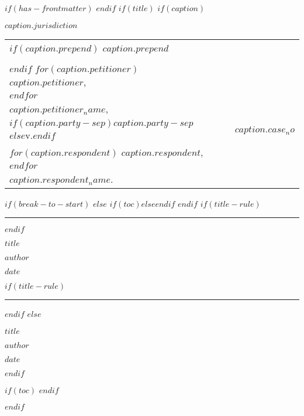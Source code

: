 $if(has-frontmatter)$
\frontmatter
$endif$
$if(title)$
\thispagestyle{empty}
$if(caption)$
\begin{center}\bfseries
    $caption.jurisdiction$
\end{center}

\vspace{1em}

\setlength{\tabcolsep}{0em}
\setlength{\parindent}{0em}
\begin{tabular}{p{} p{} | p{} p{}}
    \vspace{0.5em}
    $if(caption.prepend)$
    $caption.prepend$ &&& \\ &&& \\
    $endif$
    $for(caption.petitioner)$
    $caption.petitioner$, &&& \\
    $endfor$ &&& \\
    \hspace{5em}\textit{$caption.petitioner_name$}, & & & \\
    \vspace{0.5em}
    \hspace{2em}$if(caption.party-sep)$$caption.party-sep$$else$v.$endif$ & & &
    \vspace{0.5em} $caption.case_no$ \\
    \vspace{1em}
    $for(caption.respondent)$
    $caption.respondent$, &&& \\
    $endfor$ &&& \\
    \hspace{5em}\textit{$caption.respondent_name$}.
    & & &
    \vspace*{1em} \\
    \cline{1-2}
\end{tabular}
\setlength{\parindent}{0.5in}
\setlength{\tabcolsep}{6pt}

\vspace{2em}

$if(break-to-start)$
\vspace{2em}
$else$
$if(toc)$\vspace{2em}$else$\vspace{0.5em}$endif$
$endif$
$if(title-rule)$
\hrule
$endif$
\begin{center}\bfseries
    \MakeUppercase{$title$}

    $author$

    $date$
\end{center}
$if(title-rule)$
\hrule
$endif$
$else$
\vspace*{2in}
\begin{center}\bfseries
    $title$

    $author$

    \vspace{1em}

    $date$
\end{center}
$endif$

$if(toc)$
\clearpage
$endif$

$endif$
